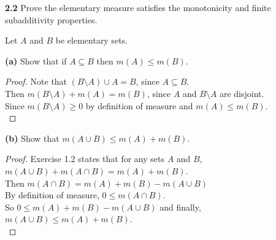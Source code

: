 \documentclass[12pt]{article}
\begin{document}
\hspace{-4 ex}\textbf{2.2} Prove the elementary measure satisfies the monotonicity and finite subadditivity properties. \bigbreak

Let $A$ and $B$ be elementary sets. \bigbreak

\hspace{-4 ex}\textbf{(a)} Show that if $A \subseteq B$ then $m(A) \leq m(B)$. \bigbreak

\begin{proof}
	Note that $(B \setminus A) \cup A = B$, since $A \subseteq B$. \\
	Then $m(B \setminus A) + m(A) = m(B)$, since $A$ and $B \setminus A$ are disjoint. \\
	Since $m(B\setminus A) \geq 0$ by definition of measure and $m(A) \leq m(B)$.\\	
\end{proof}

\hspace{-4 ex}\textbf{(b)} Show that $m(A \cup B) \leq m(A) + m(B)$. \bigbreak

\begin{proof}
	Exercise 1.2 states that for any sets $A$ and $B$, \\ $m(A\cup B)+m(A\cap B)=m(A)+m(B)$. \\
	Then $m(A\cap B) = m(A) + m(B) - m(A\cup B)$ \\
	By definition of measure, $0 \leq m(A \cap B)$. \\
	So $0 \leq m(A) + m(B) - m(A\cup B)$ and finally, $m(A\cup B) \leq m(A)+m(B)$. \\
\end{proof}
\end{document}
